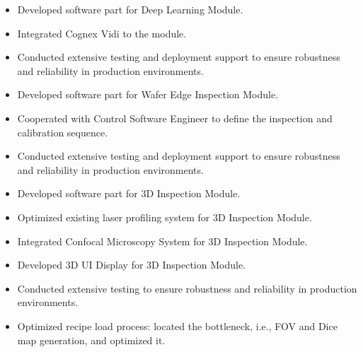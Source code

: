 \documentclass[11pt,a4paper,sans]{moderncv}
\begin{document}
\begin{itemize}
    \item Developed software part for Deep Learning Module.
    \item Integrated Cognex Vidi to the module.
    \item Conducted extensive testing and deployment support to ensure robustness and reliability in production environments.
\end{itemize}

\begin{itemize}
    \item Developed software part for Wafer Edge Inspection Module.
    \item Cooperated with Control Software Engineer to define the inspection and calibration sequence.
    \item Conducted extensive testing and deployment support to ensure robustness and reliability in production environments.
\end{itemize}

\begin{itemize}
    \item Developed software part for 3D Inspection Module.
    \item Optimized existing laser profiling system for 3D Inspection Module.
    \item Integrated Confocal Microscopy System for 3D Inspection Module.
    \item Developed 3D UI Display for 3D Inspection Module.
    \item Conducted extensive testing to ensure robustness and reliability in production environments.
\end{itemize}

\begin{itemize}
    \item Optimized recipe load process: located the bottleneck, i.e., FOV and Dice map generation, and optimized it.
\end{itemize}

\end{document}
